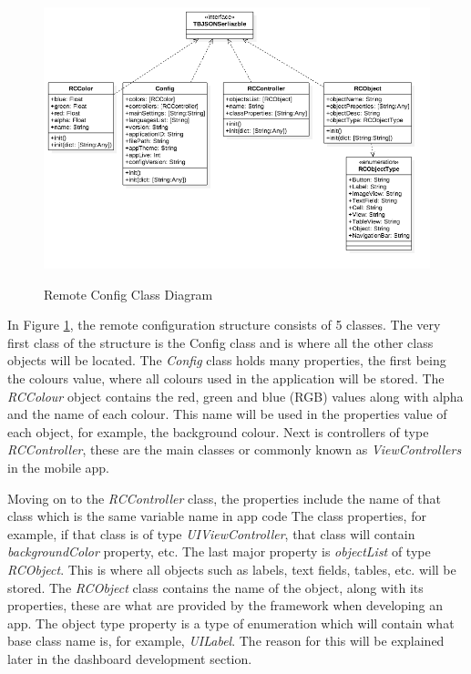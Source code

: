 \begin{figure}[!h]
    \caption{Remote Config Class Diagram}
    \centering
    \includegraphics[width=150mm]{images/classdiagrams/config}
    \label{fig:rc-cd}
\end{figure}


In Figure \ref{fig:rc-cd}, the remote configuration structure consists of 5 classes. The very first class of the structure is the Config class and is where all the other class objects will be located. The \textit{Config} class holds many properties, the first being the colours value, where all colours used in the application will be stored. The \textit{RCColour} object contains the red, green and blue (RGB) values along with alpha and the name of each colour. This name will be used in the properties value of each object, for example, the background colour. Next is controllers of type \textit{RCController}, these are the main classes or commonly known as \textit{ViewControllers} in the mobile app.

Moving on to the \textit{RCController} class, the properties include the name of that class which is the same variable name in app code The class properties, for example, if that class is of type \textit{UIViewController}, that class will contain \textit{backgroundColor} property, etc. The last major property is \textit{objectList} of type \textit{RCObject}. This is where all objects such as labels, text fields, tables, etc. will be stored. The \textit{RCObject} class contains the name of the object, along with its properties, these are what are provided by the framework when developing an app. The object type property is a type of enumeration which will contain what base class name is, for example, \textit{UILabel}. The reason for this will be explained later in the dashboard development section.

